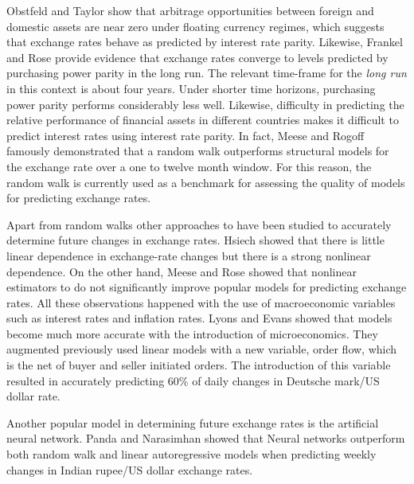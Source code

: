 \documentclass{sig-alternate-05-2015}
\begin{document}
\par{} Obstfeld and Taylor show that arbitrage opportunities between foreign and domestic assets are near zero under floating currency regimes, which suggests that exchange rates behave as predicted by interest rate parity. Likewise, Frankel and Rose provide evidence that exchange rates converge to levels predicted by purchasing power parity in the long run. The relevant time-frame for the \emph{long run} in this context is about four years. Under shorter time horizons, purchasing power parity performs considerably less well. Likewise, difficulty in predicting the relative performance of financial assets in different countries makes it difficult to predict interest rates using interest rate parity. In fact, Meese and Rogoff famously demonstrated that a random walk outperforms structural models for the exchange rate over a one to twelve month window. For this reason, the random walk is currently used as a benchmark for assessing the quality of models for predicting exchange rates.
\par{} Apart from random walks other approaches to have been studied to accurately determine future changes in exchange rates. Hsiech showed that there is little linear dependence in exchange-rate changes but there is a strong nonlinear dependence. On the other hand, Meese and Rose showed that nonlinear estimators to do not significantly improve popular models for predicting exchange rates. All these observations happened with the use of macroeconomic variables such as interest rates and inflation rates. Lyons and Evans showed that models become much more accurate with the introduction of microeconomics. They augmented previously used linear models with a new variable, order flow, which is the net of buyer and seller initiated orders. The introduction of this variable resulted in accurately predicting 60\% of daily changes in Deutsche mark/US dollar rate. 
\par{} Another popular model in determining future exchange rates is the artificial neural network. Panda and Narasimhan showed that Neural networks outperform both random walk and linear autoregressive models when predicting weekly changes in Indian rupee/US dollar exchange rates.   
\end{document}
